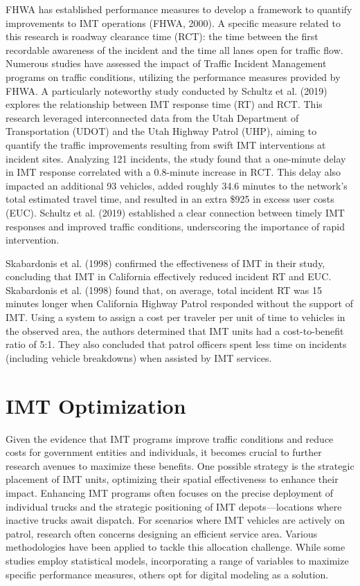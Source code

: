\documentclass[fancy, oneside, mastersfancy, ms]{byuthesis}
\begin{document}
FHWA has established performance measures to develop a framework to
quantify improvements to IMT operations (FHWA, 2000). A specific measure
related to this research is roadway clearance time (RCT): the time
between the first recordable awareness of the incident and the time all
lanes open for traffic flow. Numerous studies have assessed the impact
of Traffic Incident Management programs on traffic conditions, utilizing
the performance measures provided by FHWA. A particularly noteworthy
study conducted by Schultz et al. (2019) explores the relationship
between IMT response time (RT) and RCT. This research leveraged
interconnected data from the Utah Department of Transportation (UDOT)
and the Utah Highway Patrol (UHP), aiming to quantify the traffic
improvements resulting from swift IMT interventions at incident sites.
Analyzing 121 incidents, the study found that a one-minute delay in IMT
response correlated with a 0.8-minute increase in RCT. This delay also
impacted an additional 93 vehicles, added roughly 34.6 minutes to the
network's total estimated travel time, and resulted in an extra \$925 in
excess user costs (EUC). Schultz et al. (2019) established a clear
connection between timely IMT responses and improved traffic conditions,
underscoring the importance of rapid intervention.

Skabardonis et al. (1998) confirmed the effectiveness of IMT in their
study, concluding that IMT in California effectively reduced incident RT
and EUC. Skabardonis et al. (1998) found that, on average, total
incident RT was 15 minutes longer when California Highway Patrol
responded without the support of IMT. Using a system to assign a cost
per traveler per unit of time to vehicles in the observed area, the
authors determined that IMT units had a cost-to-benefit ratio of 5:1.
They also concluded that patrol officers spent less time on incidents
(including vehicle breakdowns) when assisted by IMT services.

\hypertarget{sec-lit_imt_opt}{%
\section{IMT Optimization}\label{sec-lit_imt_opt}}

Given the evidence that IMT programs improve traffic conditions and
reduce costs for government entities and individuals, it becomes crucial
to further research avenues to maximize these benefits. One possible
strategy is the strategic placement of IMT units, optimizing their
spatial effectiveness to enhance their impact. Enhancing IMT programs
often focuses on the precise deployment of individual trucks and the
strategic positioning of IMT depots---locations where inactive trucks
await dispatch. For scenarios where IMT vehicles are actively on patrol,
research often concerns designing an efficient service area. Various
methodologies have been applied to tackle this allocation challenge.
While some studies employ statistical models, incorporating a range of
variables to maximize specific performance measures, others opt for
digital modeling as a solution.
\end{document}
